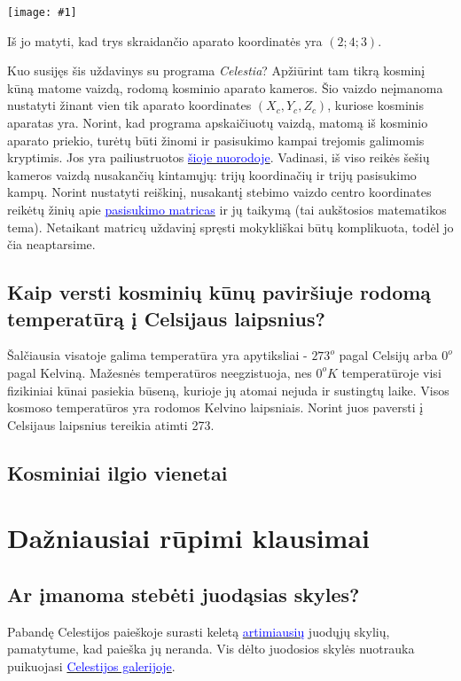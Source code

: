 \documentclass[a4paper]{article}
\newcommand{\incl}[2]{\texttt{[image: \#1]}}
\newcommand{\goto}[2]{\href{\detokenize{#1}}{\textcolor{blue}{#2}}}
\begin{document}
\incl{cartesia.png}{0.4} 

Iš jo matyti, kad trys skraidančio aparato koordinatės yra $(2; 4; 3)$. 

Kuo susijęs šis uždavinys su programa \textit{Celestia}? Apžiūrint tam tikrą kosminį kūną matome vaizdą, rodomą kosminio aparato kameros. Šio vaizdo neįmanoma nustatyti žinant vien tik aparato koordinates $(X_c, Y_c, Z_c)$, kuriose kosminis aparatas yra. Norint, kad programa apskaičiuotų vaizdą, matomą iš kosminio aparato priekio, turėtų būti žinomi ir pasisukimo kampai trejomis galimomis kryptimis. Jos yra pailiustruotos \goto{https://www.youtube.com/watch?v=pQ24NtnaLl8}{šioje nuorodoje}. Vadinasi, iš viso reikės šešių kameros vaizdą nusakančių kintamųjų: trijų koordinačių ir trijų pasisukimo kampų. Norint nustatyti reiškinį, nusakantį stebimo vaizdo centro koordinates reikėtų žinių apie \goto{https://en.wikipedia.org/wiki/Rotation_matrix}{pasisukimo matricas} ir jų taikymą (tai aukštosios matematikos tema). Netaikant matricų uždavinį spręsti mokykliškai būtų komplikuota, todėl jo čia neaptarsime.

\subsection*{Kaip versti kosminių kūnų paviršiuje rodomą temperatūrą į Celsijaus laipsnius?}

Šalčiausia visatoje galima temperatūra yra apytiksliai - $273^o$ pagal Celsijų arba $0^o$ pagal Kelviną. Mažesnės temperatūros neegzistuoja, nes $0^oK$ temperatūroje visi fizikiniai kūnai pasiekia būseną, kurioje jų atomai nejuda ir sustingtų laike. Visos kosmoso temperatūros yra rodomos Kelvino laipsniais. Norint juos paversti į Celsijaus laipsnius tereikia atimti 273.

\subsection*{Kosminiai ilgio vienetai}

\section*{Dažniausiai rūpimi klausimai}
  
\subsection*{Ar įmanoma stebėti juodąsias skyles?}

Pabandę Celestijos paieškoje surasti keletą \goto{https://en.wikipedia.org/wiki/List_of_nearest_black_holes}{artimiausių} juodųjų skylių, pamatytume, kad paieška jų neranda. Vis dėlto juodosios skylės nuotrauka puikuojasi \goto{https://celestia.space/gallery.html}{Celestijos galerijoje}. 
\end{document}
